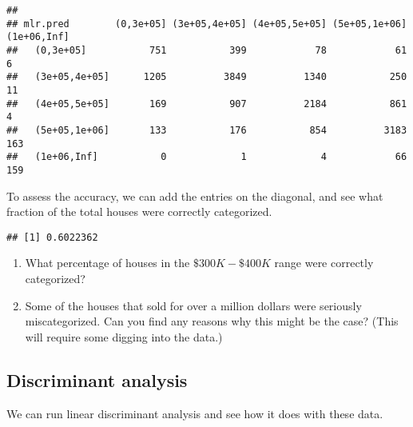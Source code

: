 \documentclass[
]{article}
\newenvironment{Shaded}{\begin{snugshade}}{\end{snugshade}}
\newcommand{\AttributeTok}[1]{\textcolor[rgb]{0.77,0.63,0.00}{#1}}
\newcommand{\FunctionTok}[1]{\textcolor[rgb]{0.00,0.00,0.00}{#1}}
\newcommand{\NormalTok}[1]{#1}
\newcommand{\OtherTok}[1]{\textcolor[rgb]{0.56,0.35,0.01}{#1}}
\newcommand{\SpecialCharTok}[1]{\textcolor[rgb]{0.00,0.00,0.00}{#1}}
\begin{document}
\begin{verbatim}
##                
## mlr.pred        (0,3e+05] (3e+05,4e+05] (4e+05,5e+05] (5e+05,1e+06] (1e+06,Inf]
##   (0,3e+05]           751           399            78            61           6
##   (3e+05,4e+05]      1205          3849          1340           250          11
##   (4e+05,5e+05]       169           907          2184           861           4
##   (5e+05,1e+06]       133           176           854          3183         163
##   (1e+06,Inf]           0             1             4            66         159
\end{verbatim}

To assess the accuracy, we can add the entries on the diagonal, and see
what fraction of the total houses were correctly categorized.

\begin{Shaded}
\end{Shaded}

\begin{verbatim}
## [1] 0.6022362
\end{verbatim}

\begin{enumerate}
\def\labelenumi{(\arabic{enumi})}
\setcounter{enumi}{1}
\item
  What percentage of houses in the \(\$300K-\$400K\) range were
  correctly categorized?
\item
  Some of the houses that sold for over a million dollars were seriously
  miscategorized. Can you find any reasons why this might be the case?
  (This will require some digging into the data.)
\end{enumerate}

\hypertarget{discriminant-analysis}{%
\subsection{Discriminant analysis}\label{discriminant-analysis}}

We can run linear discriminant analysis and see how it does with these
data.

\begin{Shaded}
\end{Shaded}
\end{document}
